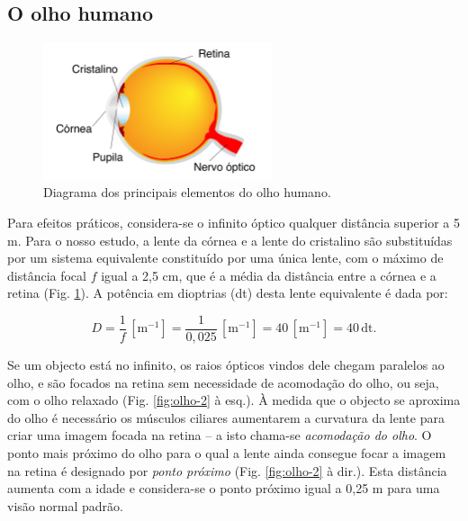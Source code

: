 \documentclass[a4paper,12pt]{article}      %
\begin{document}
\subsection{\sf O olho humano}

\begin{figure}
	[!htb]  \centering 
	\includegraphics[width=0.6\textwidth]{olho-1}
	\caption{Diagrama dos principais elementos do olho humano. \label{fig:olho-1}} 
\end{figure}

Para efeitos práticos, considera-se o infinito óptico qualquer distância superior a 5 m. Para o nosso estudo, a lente da córnea e a lente do cristalino são substituídas por um sistema equivalente constituído por uma única lente, com o máximo de distância focal $f$ igual a 2,5 cm, que é a média da distância entre a córnea e a retina (Fig. \ref{fig:olho-1}). A potência em dioptrias (dt) desta lente equivalente é dada por:

\begin{equation}
D=\frac{1}{f} \,[\mathrm{m}^{-1}] = \frac{1}{0,025} \,[\mathrm{m}^{-1}] = 40 \,[\mathrm{m}^{-1}]=40\, \mathrm{dt}.
\end{equation}



Se um objecto está no infinito, os raios ópticos vindos dele chegam paralelos ao olho, e são focados na retina sem necessidade de acomodação do olho, ou seja, com o olho relaxado (Fig. \ref{fig:olho-2} à esq.). À medida que o objecto se aproxima do olho é necessário os músculos ciliares aumentarem a curvatura da lente para criar uma imagem focada na retina -- a isto chama-se \emph{acomodação do olho}. O ponto mais próximo do olho para o qual a lente ainda consegue focar a imagem na retina é designado por \emph{ponto próximo} (Fig. \ref{fig:olho-2} à dir.). Esta distância aumenta com a idade e considera-se o ponto próximo igual a 0,25 m para uma visão normal padrão.
\end{document}
